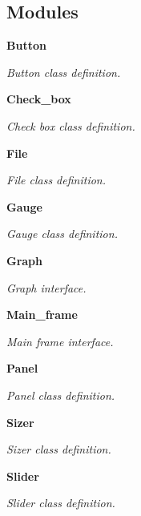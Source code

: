 \subsection*{Modules}
\begin{DoxyCompactItemize}
\item 
\textbf{ Button}
\begin{DoxyCompactList}\small\item\em Button class definition. \end{DoxyCompactList}\item 
\textbf{ Check\+\_\+box}
\begin{DoxyCompactList}\small\item\em Check box class definition. \end{DoxyCompactList}\item 
\textbf{ File}
\begin{DoxyCompactList}\small\item\em File class definition. \end{DoxyCompactList}\item 
\textbf{ Gauge}
\begin{DoxyCompactList}\small\item\em Gauge class definition. \end{DoxyCompactList}\item 
\textbf{ Graph}
\begin{DoxyCompactList}\small\item\em Graph interface. \end{DoxyCompactList}\item 
\textbf{ Main\+\_\+frame}
\begin{DoxyCompactList}\small\item\em Main frame interface. \end{DoxyCompactList}\item 
\textbf{ Panel}
\begin{DoxyCompactList}\small\item\em Panel class definition. \end{DoxyCompactList}\item 
\textbf{ Sizer}
\begin{DoxyCompactList}\small\item\em Sizer class definition. \end{DoxyCompactList}\item 
\textbf{ Slider}
\begin{DoxyCompactList}\small\item\em Slider class definition. \end{DoxyCompactList}\item 

\end{DoxyCompactItemize}
